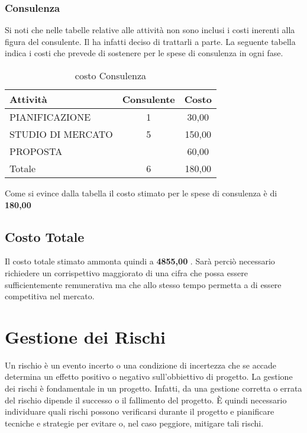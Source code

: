 	
\subsubsection*{Consulenza}
	
	
Si noti che nelle tabelle relative alle attività non sono inclusi i costi inerenti alla figura del consulente. Il  ha infatti deciso di trattarli a parte. La seguente tabella indica i costi che \team prevede di sostenere per le spese di consulenza in ogni fase.
	
\clearpage
\begin{table}[!h]
\centering
\begin{tabular}{|l|c|c|}
\hline
\textbf{Attività}& \textbf{Consulente} & \textbf{Costo}  \\ 
              
\hline

PIANIFICAZIONE		& 1& \text{\euro} 30,00 \\
STUDIO DI MERCATO 	& 5& \text{\euro} 150,00 \\
PROPOSTA 			& &	\text{\euro} 60,00 \\	
\hline
Totale				& 6& \text{\euro} 180,00 \\	
\hline
\end{tabular}
\caption{costo Consulenza}\label{tab:consulenza}
\end{table}

Come si evince dalla tabella il costo stimato per le spese di consulenza è di \textbf	{ \text{\euro} 180,00 }	

\subsection{Costo Totale}

Il costo totale stimato ammonta quindi a \textbf	{ \text{\euro} 4855,00 }.
Sarà perciò necessario richiedere un corrispettivo maggiorato di una cifra che possa essere sufficientemente remunerativa ma che allo stesso tempo permetta a \team di essere competitiva nel mercato.









\section{Gestione dei Rischi}
Un rischio è un evento incerto o una condizione di incertezza che se accade determina un effetto positivo o negativo sull'obbiettivo di progetto.
La gestione dei rischi è fondamentale in un progetto. Infatti, da una gestione corretta o errata del rischio dipende il successo o il fallimento del progetto.
È quindi necessario individuare quali rischi possono verificarsi durante il progetto e pianificare tecniche e strategie per evitare o, nel caso peggiore, mitigare tali rischi.


